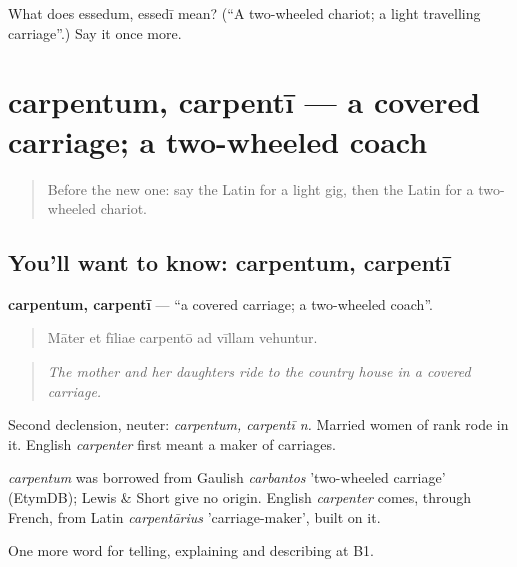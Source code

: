 \begin{tcolorbox}[breakable,colback=teal!4,colframe=teal!35!black,title={Before you move on}]
What does essedum, essedī mean? (\textquotedblleft{}A two-wheeled chariot; a light travelling carriage\textquotedblright{}.) Say it once more.
\end{tcolorbox}
\section[carpentum, carpentī]{carpentum, carpentī — a covered carriage; a two-wheeled coach}

\label{lesson:LA-C429-carpentum}



\begin{quote}
Before the new one: say the Latin for a light gig, then the Latin for a two-wheeled chariot.
\end{quote}

\subsection*{You'll want to know: carpentum, carpentī}
\textbf{carpentum, carpentī} — \textquotedblleft{}a covered carriage; a two-wheeled coach\textquotedblright{}.

\begin{quote}
Māter et fīliae carpentō ad vīllam vehuntur.
\end{quote}

\begin{quote}
\emph{The mother and her daughters ride to the country house in a covered carriage.}
\end{quote}

Second declension, neuter: \emph{carpentum, carpentī n.} Married women of rank rode in it. English \emph{carpenter} first meant a maker of carriages.

\begin{cousinweb}
\emph{carpentum} was borrowed from Gaulish \emph{carbantos} 'two-wheeled carriage' (EtymDB); Lewis \& Short give no origin. English \emph{carpenter} comes, through French, from Latin \emph{carpentārius} 'carriage-maker', built on it.
\end{cousinweb}

\begin{grammarlens}[title={What you've built}]
One more word for telling, explaining and describing at B1.
\end{grammarlens}


